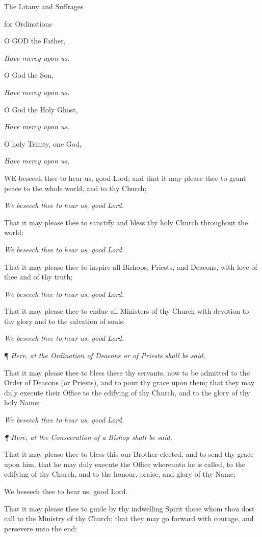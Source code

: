 The
Litany and Suffrages

for
Ordinations

O
GOD the Father, 

\emph{Have mercy upon us.}

O God the Son, 

\emph{Have mercy upon us.}

O God the Holy Ghost, 

\emph{Have mercy upon us.}

O holy Trinity, one God, 

\emph{Have mercy upon us.}

WE
beseech thee to hear us, good Lord; and that it may please thee to grant
peace to the whole world, and to thy Church;

\emph{We beseech thee to hear us, good Lord.}

That it may please thee to sanctify and bless thy
holy Church throughout the world;

\emph{We beseech thee to hear us, good Lord.}

That it may please thee to inspire all Bishops, Priests,
and Deacons, with love of thee and of thy truth;

\emph{We beseech thee to hear us, good Lord.}

That it may please thee to endue all Ministers of thy Church with devotion
to thy glory and to the salvation of souls;

\emph{We beseech thee to hear us, good Lord.}

¶ \emph{Here, at the Ordination of
Deacons or of Priests shall be said,}

That it may please thee to bless
these thy servants, now to be admitted to the Order of Deacons (or Priests),
and to pour thy grace upon them; that they may duly execute their Office
to the edifying of thy Church, and to the glory of thy holy Name;

\emph{We beseech thee to hear us, good Lord.}

\emph{¶ Here, at the Consecration
of a Bishop shall be said,}

That it may please thee to bless
this our Brother elected, and to send thy grace upon him, that he may
duly execute the Office whereunto he is called, to the edifying of thy
Church, and to the honour, praise, and glory of thy Name;

We beseech thee to hear us, good Lord.

That it may please thee to guide
by thy indwelling Spirit those whom thou dost call to the Ministry of
thy Church; that they may go forward with courage, and persevere unto
the end;

